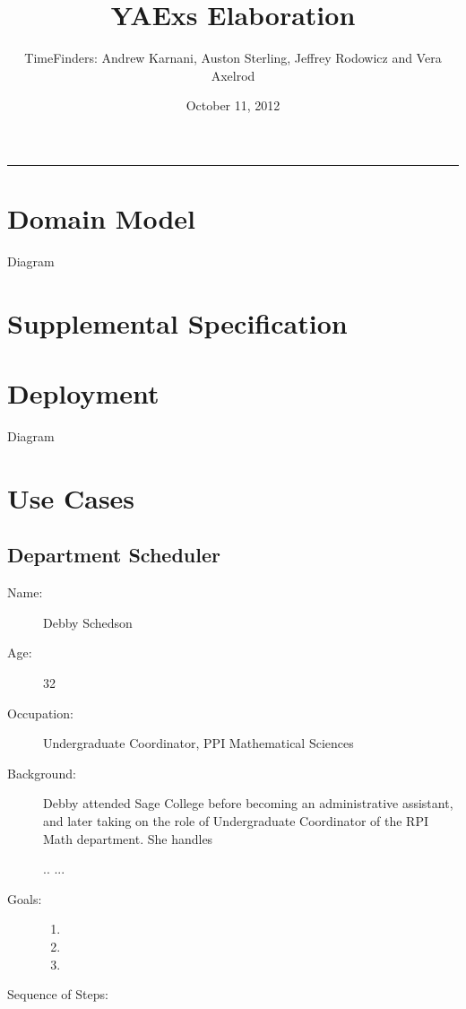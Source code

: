 \documentclass[11pt]{article}
\title{YAExs Elaboration}
\author{TimeFinders: Andrew Karnani, Auston Sterling, Jeffrey Rodowicz and Vera Axelrod}
\date{October 11, 2012}
\begin{document}
\maketitle
\tableofcontents
\vspace{0.2in}
\hrule
\vspace{1in}

\section{Domain Model}
Diagram

\section{Supplemental Specification}


\section{Deployment}
Diagram

\section{Use Cases}


\subsection{Department Scheduler}
\begin{description}
\item[Name:] Debby Schedson
\item[Age:] 32
\item[Occupation:] Undergraduate Coordinator, PPI Mathematical Sciences
\item[Background:]  Debby  attended Sage College before becoming an administrative assistant,
and later taking on the role of Undergraduate Coordinator  of the RPI Math department.  She handles

..
...



\item[Goals:]
\begin{enumerate}
\item  
\item
\item
\end{enumerate}

\item[Sequence of Steps:]

\end{description}
\end{document}
